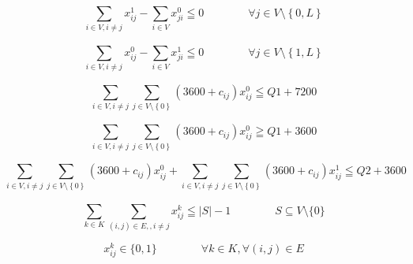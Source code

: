 \begin{equation}
  \sum_{i \in V,i\neq j}^{}x_{ij}^{1} - \sum_{i \in V}^{}x_{ji}^{0} \leqq 0
  \qquad\qquad\forall j \in V\setminus\left\{0,L \right\} \tag{6.1}
\end{equation}

\begin{equation}
  \sum_{i \in V,i\neq j}^{}x_{ij}^{0} - \sum_{i \in V}^{}x_{ji}^{1} \leqq 0
  \qquad\qquad\forall j \in V\setminus\left\{1,L \right\} \tag{6.2}
\end{equation}

\begin{equation}
  \sum_{i \in V,i\neq j}^{}\sum_{j \in V\setminus\left\{0 \right\}}^{}(3600 + c_{ij})x_{ij}^{0} \leqq Q1 + 7200 \tag{7.1}
\end{equation}

\begin{equation}
  \sum_{i \in V,i\neq j}^{}\sum_{j \in V\setminus\left\{0 \right\}}^{}(3600 + c_{ij})x_{ij}^{0} \geqq Q1 + 3600 \tag{7.2}
\end{equation}

\begin{equation}
  \sum_{i \in V,i\neq j}^{}\sum_{j \in V\setminus\left\{0 \right\}}^{}(3600 + c_{ij})x_{ij}^{0} +
  \sum_{i \in V,i\neq j}^{}\sum_{j \in V\setminus\left\{0 \right\}}^{}(3600 + c_{ij})x_{ij}^{1} \leqq Q2 + 3600 \tag{7.3}
\end{equation}

\begin{equation}
  \sum_{k \in K}^{}\sum_{(i,j) \in E,,i\neq j}^{}x_{ij}^{k} \leqq |S| - 1  \qquad \qquad  S \subseteq V \setminus \{0\} \tag{8}
\end{equation}

\begin{equation}
x_{ij}^{k} \in\{0,1\} \qquad \qquad  \forall k \in K, \forall(i, j) \in E \tag{9}
\end{equation}